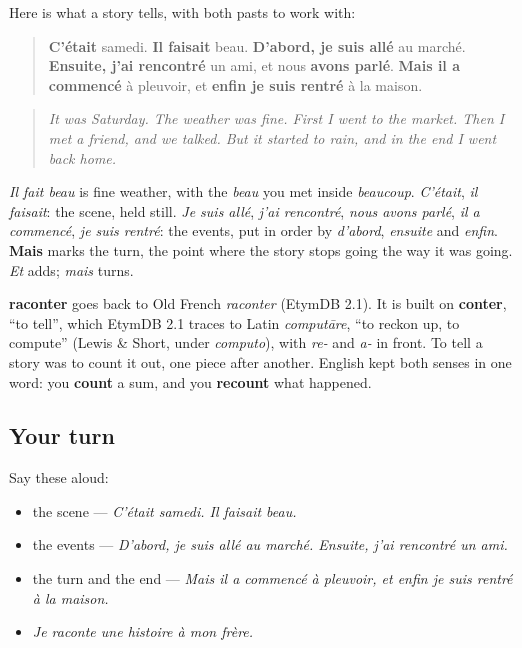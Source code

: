 \begin{grammarlens}[title={Grammar Lens: the backbone of a told story}]
Here is what a story tells, with both pasts to work with:

\begin{quote}
\textbf{C'était} samedi. \textbf{Il faisait} beau. \textbf{D'abord, je suis allé} au marché. \textbf{Ensuite, j'ai rencontré} un ami, et nous \textbf{avons parlé}. \textbf{Mais il a commencé} à pleuvoir, et \textbf{enfin je suis rentré} à la maison.
\end{quote}

\begin{quote}
\emph{It was Saturday. The weather was fine. First I went to the market. Then I met a friend, and we talked. But it started to rain, and in the end I went back home.}
\end{quote}

\emph{Il fait beau} is fine weather, with the \emph{beau} you met inside \emph{beaucoup}. \emph{C'était}, \emph{il faisait}: the scene, held still. \emph{Je suis allé}, \emph{j'ai rencontré}, \emph{nous avons parlé}, \emph{il a commencé}, \emph{je suis rentré}: the events, put in order by \emph{d'abord}, \emph{ensuite} and \emph{enfin}. \textbf{Mais} marks the turn, the point where the story stops going the way it was going. \emph{Et} adds; \emph{mais} turns.
\end{grammarlens}

\begin{cousinweb}
\textbf{raconter} goes back to Old French \emph{raconter} (EtymDB 2.1). It is built on \textbf{conter}, \textquotedblleft{}to tell\textquotedblright{}, which EtymDB 2.1 traces to Latin \emph{computāre}, \textquotedblleft{}to reckon up, to compute\textquotedblright{} (Lewis \& Short, under \emph{computo}), with \emph{re-} and \emph{a-} in front. To tell a story was to count it out, one piece after another. English kept both senses in one word: you \textbf{count} a sum, and you \textbf{recount} what happened.
\end{cousinweb}

\subsection*{Your turn}
Say these aloud:

\begin{itemize}
\raggedright
  \item the scene — \emph{C'était samedi. Il faisait beau.}
  \item the events — \emph{D'abord, je suis allé au marché. Ensuite, j'ai rencontré un ami.}
  \item the turn and the end — \emph{Mais il a commencé à pleuvoir, et enfin je suis rentré à la maison.}
  \item \emph{Je raconte une histoire à mon frère.}
\end{itemize}

